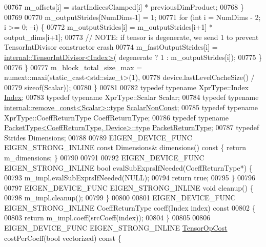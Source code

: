 \begin{DoxyCode}
00767         m\_offsets[i] = startIndicesClamped[i] * previousDimProduct;
00768       \}
00769 
00770       m\_outputStrides[NumDims-1] = 1;
00771       \textcolor{keywordflow}{for} (\textcolor{keywordtype}{int} i = NumDims - 2; i >= 0; --i) \{
00772         m\_outputStrides[i] = m\_outputStrides[i+1] * output\_dims[i+1];
00773         \textcolor{comment}{// NOTE: if tensor is degenerate, we send 1 to prevent TensorIntDivisor constructor crash}
00774         m\_fastOutputStrides[i] = \hyperlink{struct_eigen_1_1internal_1_1_tensor_int_divisor}{internal::TensorIntDivisor<Index>}(
      degenerate ? 1 : m\_outputStrides[i]);
00775       \}
00776     \}
00777     m\_block\_total\_size\_max = numext::maxi(static\_cast<std::size\_t>(1),
00778                                           device.lastLevelCacheSize() /
00779                                           \textcolor{keyword}{sizeof}(Scalar));
00780   \}
00781 
00782   \textcolor{keyword}{typedef} \textcolor{keyword}{typename} XprType::Index \hyperlink{namespace_eigen_a62e77e0933482dafde8fe197d9a2cfde}{Index};
00783   \textcolor{keyword}{typedef} \textcolor{keyword}{typename} XprType::Scalar Scalar;
00784   \textcolor{keyword}{typedef} \textcolor{keyword}{typename} \hyperlink{group___sparse_core___module}{internal::remove\_const<Scalar>::type} 
      \hyperlink{group___sparse_core___module}{ScalarNonConst};
00785   \textcolor{keyword}{typedef} \textcolor{keyword}{typename} XprType::CoeffReturnType CoeffReturnType;
00786   \textcolor{keyword}{typedef} \textcolor{keyword}{typename} \hyperlink{group___sparse_core___module}{PacketType<CoeffReturnType, Device>::type} 
      \hyperlink{group___sparse_core___module}{PacketReturnType};
00787   \textcolor{keyword}{typedef} Strides Dimensions;
00788 
00789   EIGEN\_DEVICE\_FUNC EIGEN\_STRONG\_INLINE \textcolor{keyword}{const} Dimensions& dimensions()\textcolor{keyword}{ const }\{ \textcolor{keywordflow}{return} m\_dimensions; \}
00790 
00791 
00792   EIGEN\_DEVICE\_FUNC EIGEN\_STRONG\_INLINE \textcolor{keywordtype}{bool} evalSubExprsIfNeeded(CoeffReturnType*) \{
00793     m\_impl.evalSubExprsIfNeeded(NULL);
00794     \textcolor{keywordflow}{return} \textcolor{keyword}{true};
00795   \}
00796 
00797   EIGEN\_DEVICE\_FUNC EIGEN\_STRONG\_INLINE \textcolor{keywordtype}{void} cleanup() \{
00798     m\_impl.cleanup();
00799   \}
00800 
00801   EIGEN\_DEVICE\_FUNC EIGEN\_STRONG\_INLINE CoeffReturnType coeff(Index index)\textcolor{keyword}{ const}
00802 \textcolor{keyword}{  }\{
00803     \textcolor{keywordflow}{return} m\_impl.coeff(srcCoeff(index));
00804   \}
00805 
00806   EIGEN\_DEVICE\_FUNC EIGEN\_STRONG\_INLINE \hyperlink{class_eigen_1_1_tensor_op_cost}{TensorOpCost} costPerCoeff(\textcolor{keywordtype}{bool} vectorized)\textcolor{keyword}{ const }\{

\end{DoxyCode}

